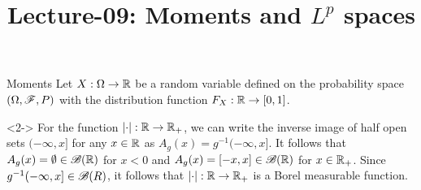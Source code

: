 \documentclass[12pt,aspectratio=169]{beamer}
\title{Lecture-09: Moments and $L^p$ spaces}
\begin{document}
\pagestyle{empty}
\maketitle

\begin{frame}{Moments}
Let $X:\Omega\to\mathbb{R}$ be a random variable defined on the probability space $(\Omega,\mathscr{F},P)$ with the distribution function $F_X:\mathbb{R} \to [0,1]$. 

\begin{Example}<2-> 
For the function $\left\lvert\cdot\right\rvert: \mathbb{R} \to \mathbb{R}_+$, 
we can write the inverse image of half open sets $(-\infty, x]$ for any $x \in \mathbb{R}$ as $A_g(x) = g^{-1}(-\infty, x]$. 
It follows that $A_g(x) = \emptyset \in \mathscr{B}(\mathbb{R})$ for $x < 0$ and $A_g(x) = [-x, x] \in \mathscr{B}(\mathbb{R})$ for $x \in \mathbb{R}_+$. 
Since $g^{-1}(-\infty, x] \in \mathscr{B}(R)$, it follows that $\left\lvert\cdot\right\rvert: \mathbb{R} \to \mathbb{R}_+$ is a Borel measurable function. 
\end{Example}
\end{frame}
\end{document}
